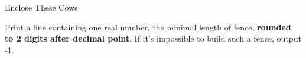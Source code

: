 \begin{problem}{Enclose These Cows}
\OutputFile

Print a line containing one real number, the minimal length of fence, \textbf{rounded to 2 digits after decimal point}. If it's impossible to build such a fence, output -1. 

\Examples

\begin{example}
%
%
\end{example}

\end{problem}
